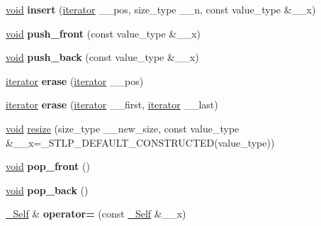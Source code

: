 \begin{DoxyCompactItemize}
\item 
\mbox{\label{classlist_a06af56573f6b4bdc032b5a551163473b}} 
\hyperlink{interfacevoid}{void} {\bfseries insert} (\hyperlink{structiterator}{iterator} \+\_\+\+\_\+pos, size\+\_\+type \+\_\+\+\_\+n, const value\+\_\+type \&\+\_\+\+\_\+x)
\item 
\mbox{\label{classlist_a1aed1f429ead998e95118341c9bec4d0}} 
\hyperlink{interfacevoid}{void} {\bfseries push\+\_\+front} (const value\+\_\+type \&\+\_\+\+\_\+x)
\item 
\mbox{\label{classlist_a86ba44fa38873679f9f9694f41b903c8}} 
\hyperlink{interfacevoid}{void} {\bfseries push\+\_\+back} (const value\+\_\+type \&\+\_\+\+\_\+x)
\item 
\mbox{\label{classlist_a4560bdf7557d5ded5e391aa961c2a94b}} 
\hyperlink{structiterator}{iterator} {\bfseries erase} (\hyperlink{structiterator}{iterator} \+\_\+\+\_\+pos)
\item 
\mbox{\label{classlist_a17614838a37bfb4bfd10bf136fe1adee}} 
\hyperlink{structiterator}{iterator} {\bfseries erase} (\hyperlink{structiterator}{iterator} \+\_\+\+\_\+first, \hyperlink{structiterator}{iterator} \+\_\+\+\_\+last)
\item 
\hyperlink{interfacevoid}{void} \hyperlink{classlist_a5d5ac3f8ac555592b578e70a2f47d7b4}{resize} (size\+\_\+type \+\_\+\+\_\+new\+\_\+size, const value\+\_\+type \&\+\_\+\+\_\+x=\+\_\+\+S\+T\+L\+P\+\_\+\+D\+E\+F\+A\+U\+L\+T\+\_\+\+C\+O\+N\+S\+T\+R\+U\+C\+T\+ED(value\+\_\+type))
\item 
\mbox{\label{classlist_a069ca47c58b14e5da576c90240db1f34}} 
\hyperlink{interfacevoid}{void} {\bfseries pop\+\_\+front} ()
\item 
\mbox{\label{classlist_a4b47aa424e48c3a3c4570a6fa3bcbb60}} 
\hyperlink{interfacevoid}{void} {\bfseries pop\+\_\+back} ()
\item 
\mbox{\label{classlist_a9380fc5de90914d0a6f2fdc9017cf3f6}} 
\hyperlink{classlist}{\+\_\+\+Self} \& {\bfseries operator=} (const \hyperlink{classlist}{\+\_\+\+Self} \&\+\_\+\+\_\+x)
\item 
\mbox{\label{classlist_ac287109ebc4184248e9e54ec336fb783}} 

\end{DoxyCompactItemize}
